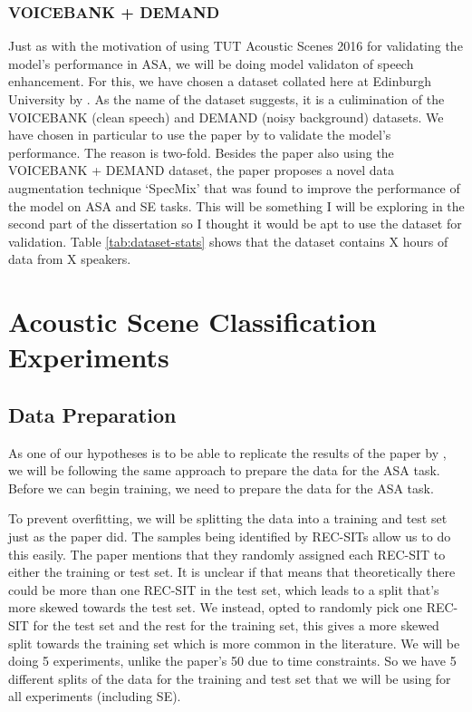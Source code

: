 \documentclass[logo,bsc,singlespacing,parskip,online]{infthesis}
\begin{document}
\subsection{VOICEBANK + DEMAND}
Just as with the motivation of using TUT Acoustic Scenes 2016 for validating the model's performance in ASA,
we will be doing model validaton of speech enhancement. 
For this, we have chosen a dataset collated here at Edinburgh University by \citet{valentini-botinhao_speech_2016}. 
As the name of the dataset suggests, it is a culimination of the VOICEBANK \cite{TODO} (clean speech) and DEMAND \cite{TODO} (noisy background) datasets.
We have chosen in particular to use the paper by \citet{kim_specmix_2021} to validate the model's performance.
The reason is two-fold. Besides the paper also using the VOICEBANK + DEMAND dataset, the paper proposes a novel data augmentation technique
`SpecMix' that was found to improve the performance of the model on ASA and SE tasks. This will be something I will be exploring in the 
second part of the dissertation so I thought it would be apt to use the dataset for validation.
Table \ref{tab:dataset-stats} shows that the dataset contains X hours of data from X speakers.

\chapter{Acoustic Scene Classification Experiments}
\label{chap:acoustic-scene-classification}
\section{Data Preparation}
\label{sec:data-preparation}
As one of our hypotheses is to be able to replicate the results of the paper by \citet{Huwel2020HearDS}, 
we will be following the same approach to prepare the data for the ASA task. 
Before we can begin training, we need to prepare the data for the ASA task.

To prevent overfitting, we will be splitting the data into a training and test set just as the paper did.
The samples being identified by REC-SITs allow us to do this easily. The paper mentions that they randomly 
assigned each REC-SIT to either the training or test set. It is unclear if 
that means that theoretically there could be more than one REC-SIT in the test set, which 
leads to a split that's more skewed towards the test set. We instead, opted to randomly pick 
one REC-SIT for the test set and the rest for the training set, this gives a more 
skewed split towards the training set which is more common in the literature.
We will be doing 5 experiments, unlike the paper's 50 due to time constraints. So 
we have 5 different splits of the data for the training and test set that we will be using 
for all experiments (including SE).
\end{document}
